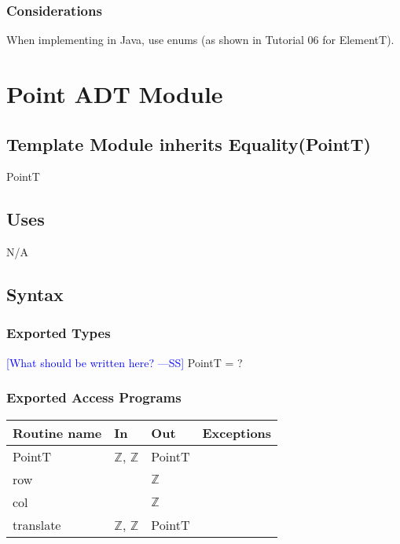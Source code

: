 \documentclass[12pt]{article}
\newcommand{\authornote}[3]{\textcolor{#1}{[#3 ---#2]}}
\newcommand{\authornote}[3]{}
\newcommand{\wss}[1]{\authornote{blue}{SS}{#1}}
\begin{document}
\subsubsection* {Considerations}

When implementing in Java, use enums (as shown in Tutorial 06 for ElementT).

\newpage

\section* {Point ADT Module}

\subsection*{Template Module inherits Equality(PointT)}

PointT

\subsection* {Uses}

N/A

\subsection* {Syntax}

\subsubsection* {Exported Types}

\wss{What should be written here?} PointT = ?

\subsubsection* {Exported Access Programs}

\begin{tabular}{| l | l | l | l |}
\hline
\textbf{Routine name} & \textbf{In} & \textbf{Out} & \textbf{Exceptions}\\
\hline
PointT & $\mathbb{Z}$, $\mathbb{Z}$ & PointT & \\
\hline
row & ~ & $\mathbb{Z}$ & ~\\
\hline
col & ~ & $\mathbb{Z}$ & ~\\
\hline
translate & $\mathbb{Z}$, $\mathbb{Z}$ & PointT & ~\\
\hline
\end{tabular}
\end{document}

